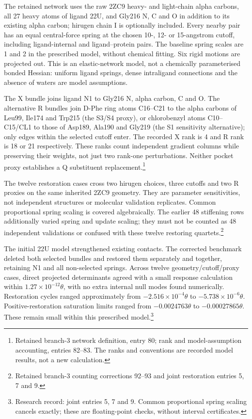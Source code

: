 \documentclass{article}
\begin{document}
The retained network uses the raw 2ZC9 heavy- and light-chain alpha carbons, all 27 heavy atoms of ligand 22U, and Gly216 N, C and O in addition to its existing alpha carbon; hirugen chain I is optionally included. Every nearby pair has an equal central-force spring at the chosen 10-, 12- or 15-angstrom cutoff, including ligand-internal and ligand--protein pairs. The baseline spring scales are 1 and 2 in the prescribed model, without chemical fitting. Six rigid motions are projected out. This is an elastic-network model, not a chemically parameterised bonded Hessian: uniform ligand springs, dense intraligand connections and the absence of waters are model assumptions.

The X bundle joins ligand N1 to Gly216 N, alpha carbon, C and O. The alternative R bundles join D-Phe ring atoms C16--C21 to the alpha carbons of Leu99, Ile174 and Trp215 (the S3/S4 proxy), or chlorobenzyl atoms C10--C15/CL1 to those of Asp189, Ala190 and Gly219 (the S1 sensitivity alternative); only edges within the selected cutoff enter. The recorded X rank is 4 and R rank is 18 or 21 respectively. These ranks count independent gradient columns while preserving their weights, not just two rank-one perturbations. Neither pocket proxy establishes a Q substituent replacement.\footnote{Retained branch-3 network definition, entry 80; rank and model-assumption accounting, entries 82--83. The ranks and conventions are recorded model results, not a new calculation.}

The twelve restoration cases cross two hirugen choices, three cutoffs and two R proxies on the same inherited 2ZC9 geometry. They are parameter sensitivities, not independent structures or molecular validation replicates. Common proportional spring scaling is covered algebraically. The earlier 48 stiffening rows additionally varied spring and update scaling; they must not be counted as 48 independent validations or confused with these twelve restoring quartets.\footnote{Retained branch-3 counting corrections 92--93 and joint restoration entries 5, 7 and 9.}

The initial 22U model strengthened existing contacts. The corrected benchmark deleted both selected bundles and restored them separately and together, retaining N1 and all non-selected springs. Across twelve geometry/cutoff/proxy cases, direct projected determinants agreed with a small response calculation within \(1.27\times10^{-12}\theta\), with no extra internal null modes found numerically. Restoration cycles ranged approximately from \(-2.516\times10^{-4}\theta\) to \(-5.738\times10^{-6}\theta\). Positive-restoration saturation limits ranged from \(-0.0024763\theta\) to \(-0.00027865\theta\). These remain small within this prescribed model.\footnote{Research record: joint entries 5, 7 and 9. Common proportional spring scaling cancels exactly; these are floating-point checks, without interval certificates.}
\end{document}
